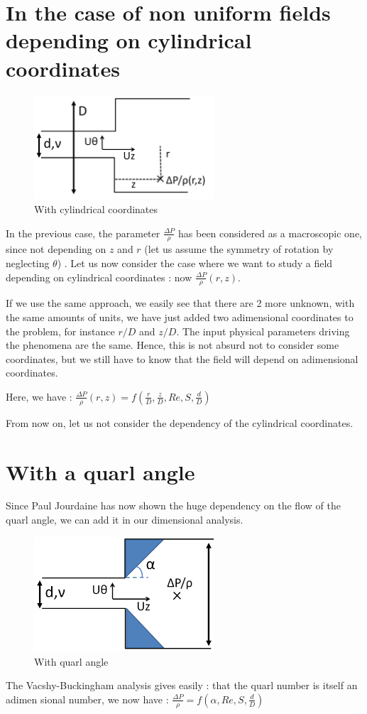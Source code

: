 \section{In the case of non uniform fields depending on cylindrical coordinates}

\begin{figure}[!h]
  \centering
\includegraphics[width=0.6\textwidth]{fig/Schema_Vashy2.png}
  \caption{With cylindrical coordinates}
 \label{Vaschy2}
\end{figure}
In the previous case, the parameter $\frac{\Delta P}{\rho}$ has been considered as a macroscopic one, since not depending on $z$ and $r$ (let us assume the symmetry of rotation by neglecting $\theta$) . Let us now consider the case where we want to study a field depending on cylindrical coordinates : now $\frac{\Delta P}{\rho}(r,z)$. 

If we use the same approach, we easily see that there are 2 more unknown, with the same amounts of units, we have just added two adimensional coordinates to the problem, for instance $r/D$ and $z/D$. The input physical parameters driving the phenomena are the same. Hence, this is not absurd not to consider some coordinates, but we still have to know that the field will depend on adimensional coordinates.

Here, we have : $\frac{\Delta P}{\rho}(r,z)=f(\frac{r}{D},\frac{z}{D},Re,S,\frac{d}{D})$

From now on, let us not consider the dependency of the cylindrical coordinates.

\section{With a quarl angle}

Since Paul Jourdaine \cite{paul_jourdaine_nom_effect_2016} has now shown the huge dependency on the flow of the quarl angle, we can add it in our dimensional analysis.

\begin{figure}[!h]
  \centering
\includegraphics[width=0.6\textwidth]{fig/Schema_Vashy3.png}
  \caption{With quarl angle}
 \label{Vaschy3}
\end{figure}

The Vacshy-Buckingham analysis gives easily : that the quarl number is itself an adimen
sional number, we now have :
$\frac{\Delta P}{\rho}=f(\alpha,Re,S,\frac{d}{D})$



